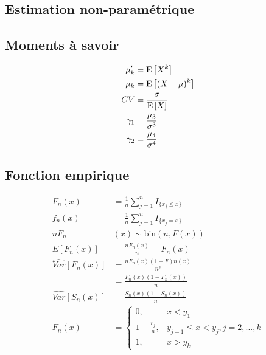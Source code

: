 \documentclass[french, landscape]{article}
\begin{document}
\small
\begin{multicols*}{3} %


\section{Estimation non-paramétrique}
\subsection*{Moments à savoir}
\begin{align*}
\mu_k^{\prime} 	& = \mathrm{E} \left[ X^k \right] \\
\mu_k			& = \mathrm{E} \left[ (X-\mu)^k \right] \\
CV				& = \frac{\sigma}{\mathrm{E} \left[ X \right]} \\
\gamma_1			& = \frac{\mu_3}{\sigma^3}  \\
\gamma_2			& = \frac{\mu_4}{\sigma^4} \\
\end{align*}

\subsection*{Fonction empirique}
\begin{align*}
F_n(x) &= \frac{1}{n} \sum\limits_{j=1}^n I_{\{ x_j \leq x\}} \\
f_n(x) &= \frac{1}{n} \sum\limits_{j=1}^n I_{\{ x_j = x\}}  \\
 n F_n&(x)  \sim \text{bin}(n, F(x))\\
E[F_n(x)] &= \frac{n F_n(x)}{n} = F_n(x)\\
\widehat{Var}[F_n(x)] &= \frac{n F_n(x)(1 - F)n(x)}{n^2} \\
       &= \frac{F_n(x)(1 - F_n(x))}{n}  \\
\widehat{Var}[S_n(x)] &= \frac{S_n(x)(1 - S_n(x))}{n} \\
F_n(x) &= 
\left\{
	\begin{array}{ll}
		0,  &  x < y_1 \\
        1 - \frac{r_j}{n}, &  y_{j-1} \leq x < y_j, j=2,...,k \\
        1, & x > y_k 
	\end{array}
\right.
\end{align*}


\end{multicols*}
\end{document}

